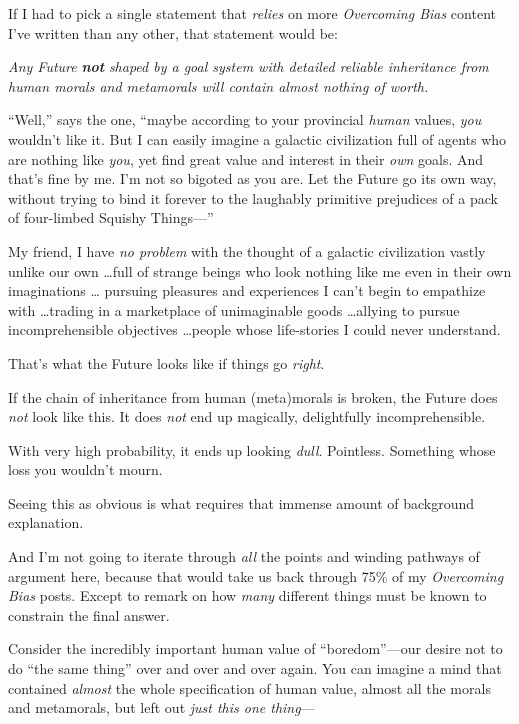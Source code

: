 
{
 If I had to pick a single statement that \textit{relies} on more
\textit{Overcoming Bias} content I've written than any
other, that statement would be: }

{
 \textit{Any Future }\textbf{\textit{not}}\textit{ shaped by a goal
system with detailed reliable inheritance from human morals and
metamorals will contain almost nothing of worth.}}

{
 ``Well,'' says the one,
``maybe according to your provincial \textit{human}
values, \textit{you} wouldn't like it. But I can easily
imagine a galactic civilization full of agents who are nothing like
\textit{you}, yet find great value and interest in their \textit{own}
goals. And that's fine by me. I'm not
so bigoted as you are. Let the Future go its own way, without trying to
bind it forever to the laughably primitive prejudices of a pack of
four-limbed Squishy Things---''}

{
 My friend, I have \textit{no problem} with the thought of a
galactic civilization vastly unlike our own \ldots full of strange
beings who look nothing like me even in their own imaginations \ldots
pursuing pleasures and experiences I can't begin to
empathize with \ldots trading in a marketplace of unimaginable goods
\ldots allying to pursue incomprehensible objectives \ldots people whose
life-stories I could never understand.}

{
 That's what the Future looks like if things go
\textit{right}.}

{
 If the chain of inheritance from human (meta)morals is broken, the
Future does \textit{not} look like this. It does \textit{not} end up
magically, delightfully incomprehensible.}

{
 With very high probability, it ends up looking \textit{dull}.
Pointless. Something whose loss you wouldn't mourn.}

{
 Seeing this as obvious is what requires that immense amount of
background explanation.}

{
 And I'm not going to iterate through \textit{all}
the points and winding pathways of argument here, because that would
take us back through 75\% of my \textit{Overcoming Bias} posts. Except
to remark on how \textit{many} different things must be known to
constrain the final answer.}

{
 Consider the incredibly important human value of
``boredom''{}---our desire not to do
``the same thing'' over and over and
over again. You can imagine a mind that contained \textit{almost} the
whole specification of human value, almost all the morals and
metamorals, but left out \textit{just this one thing}{}---}

